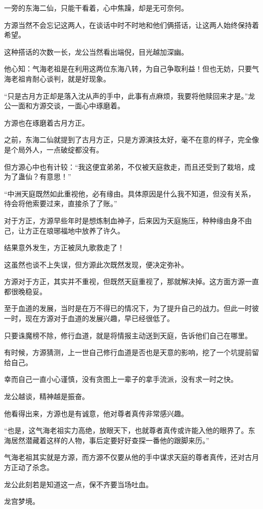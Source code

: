 \begin{this_body}
一旁的东海二仙，只能干看着，心中焦躁，却是无可奈何。

方源当然不会忘记这两人，在谈话中时不时地和他们俩搭话，让这两人始终保持着希望。

这种搭话的次数一长，龙公当然看出端倪，目光越加深幽。

他心知：气海老祖是在利用这两位东海八转，为自己争取利益！但也无妨，只要气海老祖肯耐心谈判，就是好现象。

“只是古月方正却是落入沈从声的手中，此事有点麻烦，我要将他赎回来才是。”龙公一面和方源交谈，一面心中琢磨着。

方源也在琢磨着古月方正。

之前，东海二仙就提到了古月方正，只是方源演技太好，毫不在意的样子，完全像是个局外人，一点破绽都没有。

但方源心中也有计较：“我这便宜弟弟，不仅被天庭救走，而且还受到了栽培，成为了蛊仙？有意思！”

“中洲天庭既然如此重视他，必有缘由。具体原因是什么我不知道，但没有关系，待会将他索要过来，直接杀了了账。”

对于方正，方源早些年时是想炼制血神子，后来因为天庭施压，种种缘由身不由己，让方正在琅琊福地中放养了许久。

结果意外发生，方正被凤九歌救走了！

这虽然也谈不上失误，但方源此次既然发现，便决定弥补。

方源对于方正，其实并不重视，但既然天庭重视了，那就解决掉。这方面方源一直都很晚稳妥。

至于血道的发展，当时是在万不得已的情况下，为了提升自己的战力。但此一时彼一时，现在方源对于血道的发展兴趣，早已经很低了。

只要诛魔榜不除，修行血道，就是将情报主动送到天庭，告诉他们自己在哪里。

有时候，方源猜测，上一世自己修行血道是否也是天意的影响，挖了一个坑提前留给自己。

幸而自己一直小心谨慎，没有贪图上一辈子的拿手流派，没有求一时之快。

龙公越谈，精神越是振奋。

他看得出来，方源也是有诚意，他对尊者真传非常感兴趣。

“也是，这气海老祖实力高绝，放眼天下，也就尊者真传或许能入他的眼界了。东海居然潜藏着这样的人物，事后定要好好查探一番他的跟脚来历。”

气海老祖其实就是方源，而方源不仅要从他的手中谋求天庭的尊者真传，还对古月方正动了杀念。

龙公此刻若是知道这一点，保不齐要当场吐血。

龙宫梦境。


\end{this_body}
